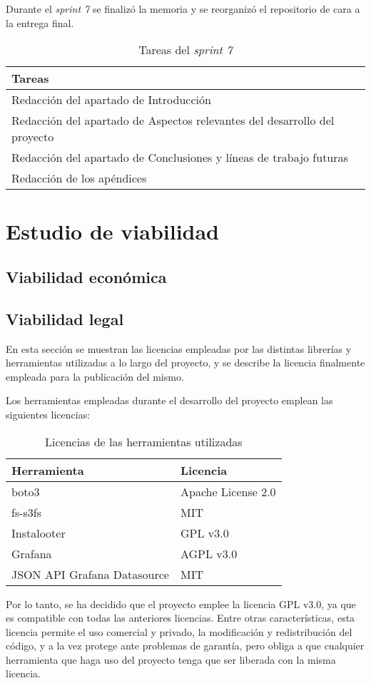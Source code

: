 Durante el \textit{sprint 7} se finalizó la memoria y se reorganizó el repositorio de cara a la entrega final.

\begin{table}[H]
    \centering
    \begin{tabular}{l}
    \hline
    \textbf{Tareas} \\ \hline
    Redacción del apartado de Introducción \\
    Redacción del apartado de Aspectos relevantes del desarrollo del proyecto \\
    Redacción del apartado de Conclusiones y líneas de trabajo futuras \\
    Redacción de los apéndices \\ \hline
    \end{tabular}
    \caption{Tareas del \textit{sprint 7}}
    \label{tab:tasks_sprint7}
\end{table}

\section{Estudio de viabilidad}

\subsection{Viabilidad económica}

\subsection{Viabilidad legal}

En esta sección se muestran las licencias empleadas por las distintas librerías y herramientas utilizadas a lo largo del proyecto, y se describe la licencia finalmente empleada para la publicación del mismo.

Los herramientas empleadas durante el desarrollo del proyecto emplean las siguientes licencias:

\begin{table}[H]
    \centering
    \begin{tabular}{ll}
    \hline
    \textbf{Herramienta} & \textbf{Licencia} \\ \hline
    boto3 & Apache License 2.0 \\
    fs-s3fs & MIT \\
    Instalooter & GPL v3.0 \\
    Grafana & AGPL v3.0 \\
    JSON API Grafana Datasource & MIT \\ \hline
    \end{tabular}
    \caption{Licencias de las herramientas utilizadas}
    \label{tab:licencias}
\end{table}

Por lo tanto, se ha decidido que el proyecto emplee la licencia GPL v3.0, ya que es compatible con todas las anteriores licencias. Entre otras características, esta licencia permite el uso comercial y privado, la modificación y redistribución del código, y a la vez protege ante problemas de garantía, pero obliga a que cualquier herramienta que haga uso del proyecto tenga que ser liberada con la misma licencia.
